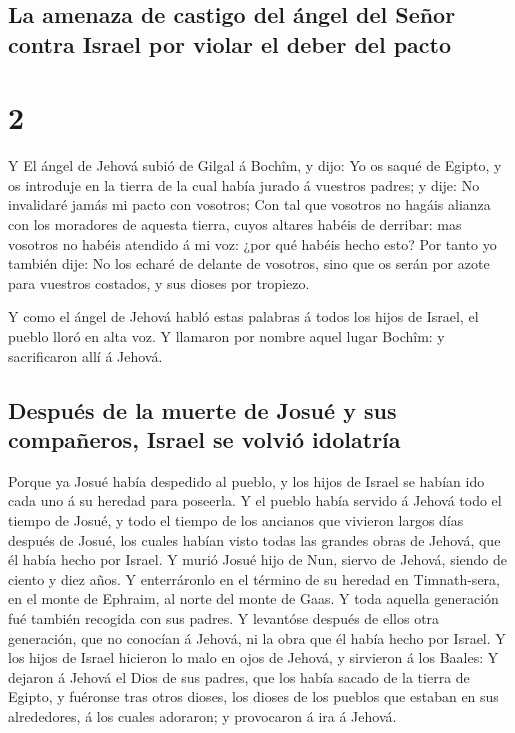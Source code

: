 \hypertarget{la-amenaza-de-castigo-del-uxe1ngel-del-seuxf1or-contra-israel-por-violar-el-deber-del-pacto}{%
\subsection{La amenaza de castigo del ángel del Señor contra Israel por
violar el deber del
pacto}\label{la-amenaza-de-castigo-del-uxe1ngel-del-seuxf1or-contra-israel-por-violar-el-deber-del-pacto}}

\hypertarget{section-07-2}{%
\section{2}\label{section-07-2}}

 Y El ángel de Jehová subió de Gilgal á Bochîm, y dijo: Yo
os saqué de Egipto, y os introduje en la tierra de la cual había jurado
á vuestros padres; y dije: No invalidaré jamás mi pacto con vosotros;
 Con tal que vosotros no hagáis alianza con los moradores
de aquesta tierra, cuyos altares habéis de derribar: mas vosotros no
habéis atendido á mi voz: ¿por qué habéis hecho esto?  Por
tanto yo también dije: No los echaré de delante de vosotros, sino que os
serán por azote para vuestros costados, y sus dioses por tropiezo.

 Y como el ángel de Jehová habló estas palabras á todos
los hijos de Israel, el pueblo lloró en alta voz.  Y
llamaron por nombre aquel lugar Bochîm: y sacrificaron allí á Jehová.

\hypertarget{despuuxe9s-de-la-muerte-de-josuuxe9-y-sus-compauxf1eros-israel-se-volviuxf3-idolatruxeda}{%
\subsection{Después de la muerte de Josué y sus compañeros, Israel se
volvió
idolatría}\label{despuuxe9s-de-la-muerte-de-josuuxe9-y-sus-compauxf1eros-israel-se-volviuxf3-idolatruxeda}}

 Porque ya Josué había despedido al pueblo, y los hijos de
Israel se habían ido cada uno á su heredad para poseerla. 
Y el pueblo había servido á Jehová todo el tiempo de Josué, y todo el
tiempo de los ancianos que vivieron largos días después de Josué, los
cuales habían visto todas las grandes obras de Jehová, que él había
hecho por Israel.  Y murió Josué hijo de Nun, siervo de
Jehová, siendo de ciento y diez años.  Y enterráronlo en
el término de su heredad en Timnath-sera, en el monte de Ephraim, al
norte del monte de Gaas.  Y toda aquella generación fué
también recogida con sus padres. Y levantóse después de ellos otra
generación, que no conocían á Jehová, ni la obra que él había hecho por
Israel.  Y los hijos de Israel hicieron lo malo en ojos
de Jehová, y sirvieron á los Baales:  Y dejaron á Jehová
el Dios de sus padres, que los había sacado de la tierra de Egipto, y
fuéronse tras otros dioses, los dioses de los pueblos que estaban en sus
alrededores, á los cuales adoraron; y provocaron á ira á Jehová.

